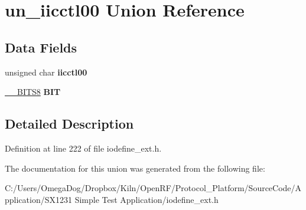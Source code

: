 \hypertarget{unionun__iicctl00}{\section{un\-\_\-iicctl00 Union Reference}
\label{unionun__iicctl00}
}
\subsection*{Data Fields}
\begin{DoxyCompactItemize}
\item 
\hypertarget{unionun__iicctl00_a78335c835768c7c8f5c183417a7c0807}{unsigned char {\bfseries iicctl00}}\label{unionun__iicctl00_a78335c835768c7c8f5c183417a7c0807}

\item 
\hypertarget{unionun__iicctl00_ae63ad502e70534d3c7cd85c6bd1a7912}{\hyperlink{struct_____b_i_t_s8}{\-\_\-\-\_\-\-B\-I\-T\-S8} {\bfseries B\-I\-T}}\label{unionun__iicctl00_ae63ad502e70534d3c7cd85c6bd1a7912}

\end{DoxyCompactItemize}


\subsection{Detailed Description}


Definition at line 222 of file iodefine\-\_\-ext.\-h.



The documentation for this union was generated from the following file\-:\begin{DoxyCompactItemize}
\item 
C\-:/\-Users/\-Omega\-Dog/\-Dropbox/\-Kiln/\-Open\-R\-F/\-Protocol\-\_\-\-Platform/\-Source\-Code/\-Application/\-S\-X1231 Simple Test Application/iodefine\-\_\-ext.\-h\end{DoxyCompactItemize}
